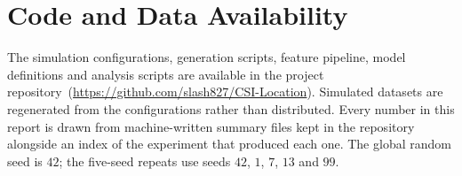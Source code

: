 \section{Code and Data Availability}
\label{app:reproducibility}

The simulation configurations, generation scripts, feature pipeline, model definitions and analysis scripts are available in the project repository~(\url{https://github.com/slash827/CSI-Location}). Simulated datasets are regenerated from the configurations rather than distributed. Every number in this report is drawn from machine-written summary files kept in the repository alongside an index of the experiment that produced each one. The global random seed is $42$; the five-seed repeats use seeds $42$, $1$, $7$, $13$ and $99$.
